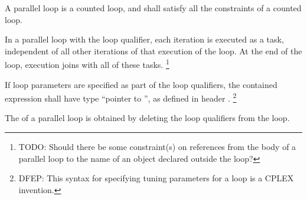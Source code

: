 \pnum
A parallel loop is a counted loop,
and shall satisfy all the constraints of a counted loop.

\pnum
In a parallel loop with the
loop qualifier,
each iteration is
executed as a task, independent of
all other iterations of that execution of the loop.
At the end of the loop,
execution joins with all of these tasks.
\footnote{TODO:
Should there be some constraint(s) on references
from the body of a parallel loop
to the name of an object declared outside the loop?
}

\pnum
If loop parameters are specified as part of the loop qualifiers,
the contained expression shall have type
``pointer to '',
as defined in header
.%
\footnote{DFEP:
This syntax for specifying tuning parameters for a loop
is a CPLEX invention.
}

\pnum
The
of a parallel loop
is obtained by deleting the loop qualifiers from the loop.